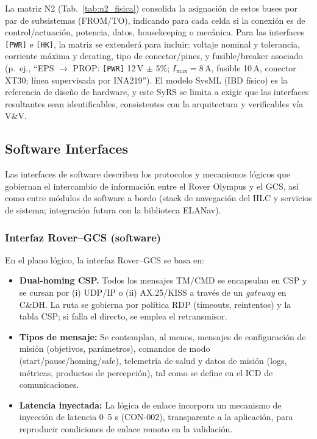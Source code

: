 La matriz N2 (Tab.~\ref{tab:n2_fisica}) consolida la asignación de estos buses por par de subsistemas (FROM/TO), indicando para cada celda si la conexión es de control/actuación, potencia, datos, housekeeping o mecánica. Para las interfaces \texttt{[PWR]} e \texttt{[HK]}, la matriz se extenderá para incluir: voltaje nominal y tolerancia, corriente máxima y derating, tipo de conector/pines, y fusible/breaker asociado (p.\ ej., ``EPS $\rightarrow$ PROP: \texttt{[PWR]} 12\,V $\pm$ 5\%; $I_{\max}=8$\,A, fusible 10\,A, conector XT30; línea supervisada por INA219''). El modelo SysML (IBD físico) es la referencia de diseño de hardware, y este SyRS se limita a exigir que las interfaces resultantes sean identificables, consistentes con la arquitectura y verificables vía V\&V.

\subsection{Software Interfaces}\label{subsec:software_interfaces}

Las interfaces de software describen los protocolos y mecanismos lógicos que gobiernan el intercambio de información entre el Rover Olympus y el GCS, así como entre módulos de software a bordo (stack de navegación del HLC y servicios de sistema; integración futura con la biblioteca ELANav).

\subsubsection{Interfaz Rover–GCS (software)}

En el plano lógico, la interfaz Rover–GCS se basa en:

\begin{itemize}
    \item \textbf{Dual-homing CSP.} Todos los mensajes TM/CMD se encapsulan en CSP y
    se cursan por (i) UDP/IP o (ii) AX.25/KISS a través de un \emph{gateway}
    en C\&DH. La ruta se gobierna por política RDP (timeouts, reintentos) y
    la tabla CSP; si falla el directo, se emplea el retransmisor.

    \item \textbf{Tipos de mensaje:} Se contemplan, al menos, mensajes de configuración de misión (objetivos, parámetros), comandos de modo (start/pause/homing/safe), telemetría de salud y datos de misión (logs, métricas, productos de percepción), tal como se define en el ICD de comunicaciones.
    \item \textbf{Latencia inyectada:} La lógica de enlace incorpora un mecanismo de inyección de latencia 0--5 s (CON‑002), transparente a la aplicación, para reproducir condiciones de enlace remoto en la validación.
\end{itemize}


